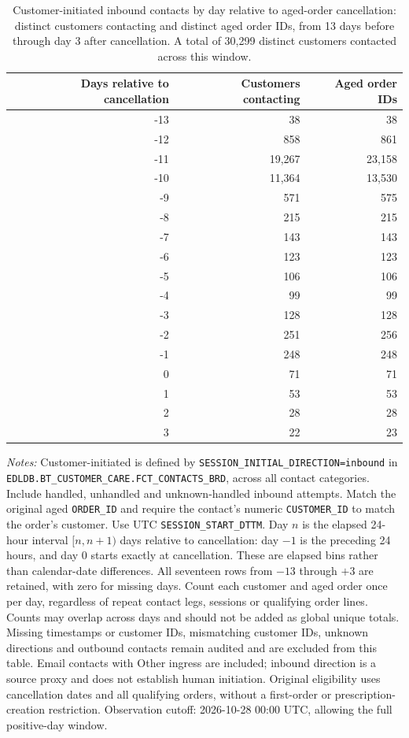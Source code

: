 \begin{table}[!htbp]
\centering
\caption{Customer-initiated inbound contacts by day relative to aged-order cancellation: distinct customers contacting and distinct aged order IDs, from 13 days before through day 3 after cancellation. A total of 30,299 distinct customers contacted across this window.}
\label{tab:aged-customer-contacts-by-cancellation-day}
\begin{tabular}{@{}rrr@{}}
\toprule
Days relative to cancellation & Customers contacting & Aged order IDs \\
\midrule
-13 & 38 & 38 \\
-12 & 858 & 861 \\
-11 & 19,267 & 23,158 \\
-10 & 11,364 & 13,530 \\
-9 & 571 & 575 \\
-8 & 215 & 215 \\
-7 & 143 & 143 \\
-6 & 123 & 123 \\
-5 & 106 & 106 \\
-4 & 99 & 99 \\
-3 & 128 & 128 \\
-2 & 251 & 256 \\
-1 & 248 & 248 \\
0 & 71 & 71 \\
1 & 53 & 53 \\
2 & 28 & 28 \\
3 & 22 & 23 \\
\bottomrule
\end{tabular}

\begin{minipage}{\linewidth}
\footnotesize
\textit{Notes:} Customer-initiated is defined by
\texttt{SESSION\_INITIAL\_DIRECTION=inbound} in
\texttt{EDLDB.BT\_CUSTOMER\_CARE.FCT\_CONTACTS\_BRD}, across all contact
categories. Include handled, unhandled and unknown-handled inbound attempts. Match the original aged \texttt{ORDER\_ID} and require
the contact's numeric \texttt{CUSTOMER\_ID} to match the order's customer.
Use UTC \texttt{SESSION\_START\_DTTM}. Day $n$ is the elapsed 24-hour interval
$[n,n+1)$ days relative to cancellation: day $-1$ is the preceding 24 hours,
and day $0$ starts exactly at cancellation. These are elapsed bins rather
than calendar-date differences. All seventeen rows from $-13$ through $+3$
are retained, with zero for missing days. Count each customer and aged order
once per day, regardless of repeat contact legs, sessions or qualifying order
lines. Counts may overlap across days and should not be added as global unique
totals. Missing timestamps or customer IDs, mismatching customer IDs, unknown
directions and outbound contacts remain audited and are excluded from this
table. Email contacts with Other ingress are included; inbound direction is
a source proxy and does not establish human initiation.
Original eligibility uses cancellation
dates and all qualifying orders, without a first-order or prescription-creation
restriction. Observation cutoff: 2026-10-28 00:00 UTC, allowing the full positive-day window.
\end{minipage}
\end{table}

